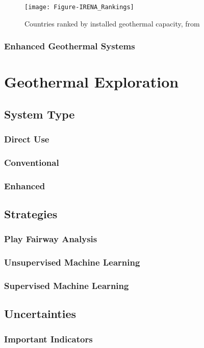 \begin{figure}[htbp]
\centering
\texttt{[image: Figure-IRENA\_Rankings]}
\caption[Country rankings, installed geothermal capacity ]{Countries ranked by installed geothermal capacity, from \protect\citep{irena_country_2021}}
\label{fig:irena-rank}
\end{figure}

\subsubsection{Enhanced Geothermal Systems}

\section{Geothermal Exploration}\label{ch2:geoexp}
\subsection{System Type}
\subsubsection{Direct Use}
\subsubsection{Conventional}
\subsubsection{Enhanced}
\subsection{Strategies}
\subsubsection{Play Fairway Analysis}
\subsubsection{Unsupervised Machine Learning}
\subsubsection{Supervised Machine Learning}
\subsection{Uncertainties}
\subsubsection{Important Indicators}
